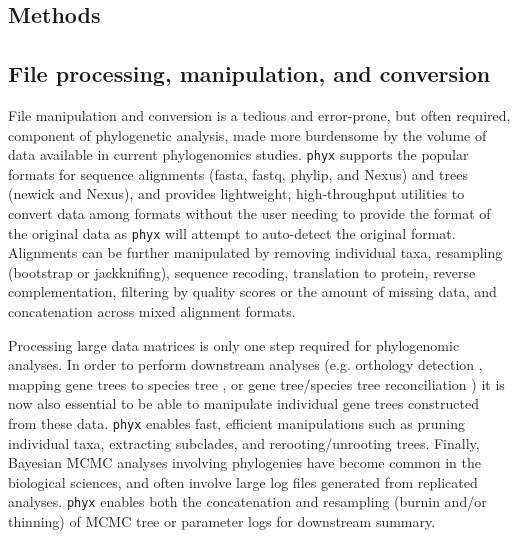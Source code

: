\documentclass{bioinfo}
\begin{document}
\begin{methods}
\section{Methods}

\subsection{File processing, manipulation, and conversion}

File manipulation and conversion is a tedious and error-prone, but often required, component of phylogenetic analysis, made more burdensome by the volume of data available in current phylogenomics studies. \texttt{phyx} supports the popular formats for sequence alignments (fasta, fastq, phylip, and Nexus) and trees (newick and Nexus), and provides lightweight, high-throughput utilities to convert data among formats without the user needing to provide the format of the original data as \texttt{phyx} will attempt to auto-detect the original format. Alignments can be further manipulated by removing individual taxa, resampling (bootstrap or jackknifing), sequence recoding, translation to protein, reverse complementation, filtering by quality scores or the amount of missing data, and concatenation across mixed alignment formats.

Processing large data matrices is only one step required for phylogenomic analyses. In order to perform downstream analyses (e.g. orthology detection \citep{YangSmith2014}, mapping gene trees to species tree \citep{Smith2015}, or gene tree/species tree reconciliation \citep{Mirarab2014}) it is now also essential to be able to manipulate individual gene trees constructed from these data. \texttt{phyx} enables fast, efficient manipulations such as pruning individual taxa, extracting subclades, and rerooting/unrooting trees. Finally, Bayesian MCMC analyses involving phylogenies have become common in the biological sciences, and often involve large log files generated from replicated analyses. \texttt{phyx} enables both the concatenation and resampling (burnin and/or thinning) of MCMC tree or parameter logs for downstream summary.


\end{methods}
\end{document}
